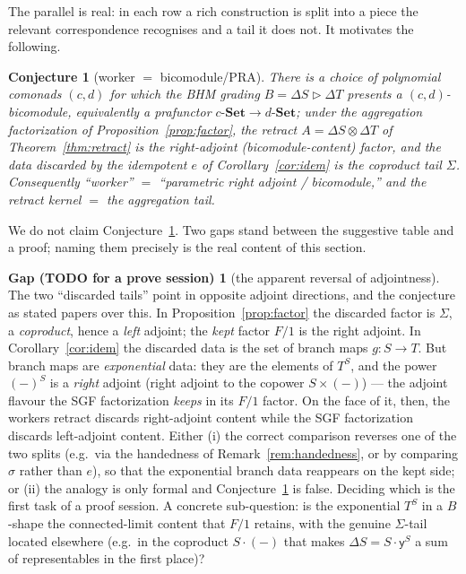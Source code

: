 \documentclass[11pt]{amsart}
\theoremstyle{plain}
\newtheorem{conjecture}[theorem]{Conjecture}
\theoremstyle{definition}
\theoremstyle{gap}
\newtheorem{gap}[theorem]{Gap (TODO for a prove session)}
\newcommand{\Set}{\mathbf{Set}}
\renewcommand{\lhd}{\vartriangleright}
\newcommand{\Store}[1]{\Delta #1}
\newcommand{\yon}{\mathsf{y}}
\begin{document}
The parallel is real: in each row a rich construction is split into a piece the
relevant correspondence recognises and a tail it does not. It motivates the following.

\begin{conjecture}[worker $=$ bicomodule/PRA]\label{conj:worker-pra}
There is a choice of polynomial comonads $(c,d)$ for which the BHM grading
$B=\Store{S}\lhd\Store{T}$ presents a $(c,d)$-bicomodule, equivalently a prafunctor
$c\text{-}\Set\to d\text{-}\Set$; under the aggregation factorization of
Proposition~\ref{prop:factor}, the retract $A=\Store{S}\otimes\Store{T}$ of
Theorem~\ref{thm:retract} is the right-adjoint (bicomodule-content) factor, and the
data discarded by the idempotent $e$ of Corollary~\ref{cor:idem} is the coproduct
tail $\Sigma$. Consequently ``worker'' $=$ ``parametric right adjoint / bicomodule,''
and the retract kernel $=$ the aggregation tail.
\end{conjecture}

We do not claim Conjecture~\ref{conj:worker-pra}. Two gaps stand between the suggestive
table and a proof; naming them precisely is the real content of this section.

\begin{gap}[the apparent reversal of adjointness]\label{gap:adjoint}
The two ``discarded tails'' point in opposite adjoint directions, and the conjecture
as stated papers over this. In Proposition~\ref{prop:factor} the discarded factor is
$\Sigma$, a \emph{coproduct}, hence a \emph{left} adjoint; the \emph{kept} factor
$F/1$ is the right adjoint. In Corollary~\ref{cor:idem} the discarded data is the set
of branch maps $g\colon S\to T$. But branch maps are \emph{exponential} data: they
are the elements of $T^{S}$, and the power $(-)^{S}$ is a \emph{right} adjoint (right
adjoint to the copower $S\times(-)$) --- the adjoint flavour the SGF factorization
\emph{keeps} in its $F/1$ factor. On the face of it, then, the workers retract discards right-adjoint
content while the SGF factorization discards left-adjoint content. Either (i) the
correct comparison reverses one of the two splits (e.g.\ via the handedness of
Remark~\ref{rem:handedness}, or by comparing $\sigma$ rather than $e$), so that the
exponential branch data reappears on the kept side; or (ii) the analogy is only
formal and Conjecture~\ref{conj:worker-pra} is false. Deciding which is the first
task of a proof session. A concrete sub-question: is the exponential $T^S$ in a
$B$-shape the connected-limit content that $F/1$ retains, with the genuine
$\Sigma$-tail located elsewhere (e.g.\ in the coproduct $S\cdot(-)$ that makes
$\Store{S}=S\cdot\yon^S$ a sum of representables in the first place)?
\end{gap}
\end{document}
